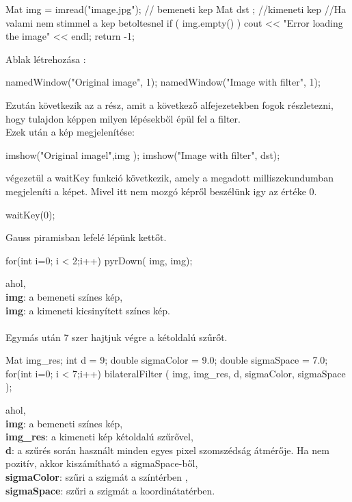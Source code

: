 \begin{cpp}
    Mat img = imread("image.jpg"); // bemeneti kep
    Mat dst ; //kimeneti kep
    //Ha valami nem stimmel a kep betoltesnel
    if ( img.empty() )
    {
        cout << "Error loading the image" << endl;
        return -1;
    }
\end{cpp} 
Ablak létrehozása :
\begin{cpp}
    namedWindow("Original image", 1);
    namedWindow("Image with filter", 1);
\end{cpp}
Ezután következik az a rész, amit a következő alfejezetekben fogok részletezni, hogy tulajdon képpen milyen lépésekből épül fel a filter. \\
Ezek után a kép megjelenítése:
\begin{cpp}
    imshow("Original imagel",img );
    imshow("Image with filter", dst);
\end{cpp} 
\newpage
{} végezetül a waitKey funkció következik, amely a megadott milliszekundumban megjeleníti a képet. Mivel itt nem mozgó képről beszélünk igy az értéke 0.
 \begin{cpp}
    waitKey(0);
\end{cpp}
Gauss piramisban lefelé lépünk kettőt.
\begin{cpp}
 for(int i=0; i < 2;i++){
    pyrDown( img, img);
    }
\end{cpp}
ahol, \\
\indent \textbf{img}: a bemeneti színes kép,\\
\indent \textbf{img}: a kimeneti kicsinyített színes kép.\\\\
Egymás után 7 szer hajtjuk végre a kétoldalú szűrőt.
\begin{cpp}
Mat img_res;
int d = 9;
double sigmaColor = 9.0;
double sigmaSpace = 7.0;
for(int i=0; i < 7;i++){
    bilateralFilter ( img, img_res, d, sigmaColor, sigmaSpace );
    }
\end{cpp}
ahol, \\
\indent \textbf{img}: a bemeneti színes kép,\\
\indent \textbf{img\_res}: a kimeneti kép kétoldalú szűrővel,\\
\indent \textbf{d}: a szűrés során használt minden egyes pixel szomszédság átmérője. Ha nem pozitív, akkor kiszámítható a sigmaSpace-ből,\\
\indent \textbf{sigmaColor}: szűri a szigmát a színtérben ,\\
\indent \textbf{sigmaSpace}: szűri a szigmát a koordinátatérben.\\ \\
